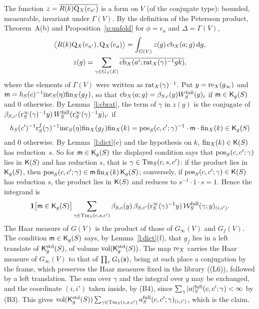 \documentclass[11pt,a4paper]{article}
\makeatletter
\theoremstyle{plainx}
\theoremstyle{uprightx}
\renewenvironment{proof}[1][Proof]{\par\pushQED{\qed}\normalfont\topsep0pt\partopsep0pt
  \trivlist\item[\hskip\labelsep\itshape #1.]\ignorespaces}{\popQED\endtrivlist\@endpefalse}
\newcommand{\dd}{\mathrm{d}}
\newcommand{\Inp}[1]{\textup{(#1)}}
\makeatother
\begin{document}
\begin{proof}[Proof of Theorem B]
The function $z=\overline{R(k)\mathrm{Q}_{X}(e_{a'})}$ is a form on $V$ (of the conjugate type): bounded, measurable,
invariant under $\Gamma(V)$. By the definition of the Petersson product, Theorem~A(b) and
Proposition~\ref{p:unfold} for $\phi=e_a$ and $\Delta=\Gamma(V)$,
\begin{gather*}\bigl\langle R(k)\Pmap{X}(e_{a'}),\Pmap{X}(e_a)\bigr\rangle=\int_{G(V)}z(g)\,\cutB{X}{a}{g}\,\dd g,\\
z(g)=\sum_{\gamma\in\GS{S}{E}}\overline{\cutB{X}{a'}{\ratEq{X}(\gamma)^{-1}gk}},\end{gather*}
where the elements of $\Gamma(V)$ were written as $\mathrm{rat}_{X}(\gamma)^{-1}$. Put $y=\mathrm{re}_{X}(g_\infty)$ and
$\mathsf{m}=h_{S}(c)^{-1}\mathrm{inc}_{S}(\eta)\mathrm{fin}_{X}(g_f)$, so that $\mathrm{cb}_{X}(a;g)=\beta_{S,c}(y)W^{\mathrm{full}}_{S}(y)_{i}$ if
$\mathsf{m}\in\mathsf{K}_g(S)$ and $0$ otherwise. By Lemma~\ref{l:cbrat}, the term of $\gamma$ in $z(g)$ is the conjugate of
$\beta_{S,c'}(\mathrm{r}^{\infty}_{S}(\gamma)^{-1}y)\,W^{\mathrm{full}}_{S}(\mathrm{r}^{\infty}_{S}(\gamma)^{-1}y)_{i'}$ if
\[h_{S}(c')^{-1}\mathrm{r}^{f}_{S}(\gamma)^{-1}\mathrm{inc}_{S}(\eta)\mathrm{fin}_{X}(g_f)\mathrm{fin}_{X}(k)=\mathrm{pos}_{S}(c,c';\gamma)^{-1}\cdot\mathsf{m}\cdot\mathrm{fin}_{X}(k)\in\mathsf{K}_g(S)\]
and $0$ otherwise. By Lemma~\ref{l:dict}(e) and the hypothesis on $k$, $\mathrm{fin}_{X}(k)\in\mathsf{K}(S)$ has reduction~$s$. So
for $\mathsf{m}\in\mathsf{K}_g(S)$ the displayed condition says that $\mathrm{pos}_{S}(c,c';\gamma)$ lies in $\mathsf{K}(S)$ and has
reduction $s$, that is $\gamma\in\mathrm{Tm}_{S}(c,s,c')$: if the product lies in $\mathsf{K}_g(S)$, then
$\mathrm{pos}_{S}(c,c';\gamma)\in\mathsf{m}\,\mathrm{fin}_{X}(k)\,\mathsf{K}_g(S)$; conversely, if $\mathrm{pos}_{S}(c,c';\gamma)\in\mathsf{K}(S)$ has
reduction $s$, the product lies in $\mathsf{K}(S)$ and reduces to $s^{-1}\cdot1\cdot s=1$. Hence the integrand is
\[\mathbf{1}\bigl[\mathsf{m}\in\mathsf{K}_g(S)\bigr]\sum_{\gamma\in\mathrm{Tm}_{S}(c,s,c')}\beta_{S,c}(y)\,\beta_{S,c'}(\mathrm{r}^{\infty}_{S}(\gamma)^{-1}y)\,
\mathcal{W}^{\mathrm{full}}_{S}(\gamma;y)_{(i,i')}.\]
The Haar measure of $G(V)$ is the product of those of $G_\infty(V)$ and $G_f(V)$. The condition
$\mathsf{m}\in\mathsf{K}_g(S)$ says, by Lemma~\ref{l:dict}(f), that $g_f$ lies in a left translate of $\mathsf{K}^{\mathrm{std}}_{g}(S)$, of volume
$\operatorname{vol}(\mathsf{K}^{\mathrm{std}}_{g}(S))$. The map $\mathrm{re}_{X}$ carries the Haar measure of $G_\infty(V)$ to that of $\prod_\tau G_{1}(\mathfrak{s})$,
being at each place a conjugation by the frame, which preserves the Haar measures fixed in the library
(\Inp{L6}), followed by a left translation. The sum over $\gamma$ and the integral over $y$ may be exchanged, and the coordinate $(i,i')$
taken inside, by \Inp{B4}, since $\sum_\gamma|a|^{\mathrm{full}}_{S}(c,c';\gamma)<\infty$ by \Inp{B3}. This gives
$\operatorname{vol}(\mathsf{K}^{\mathrm{std}}_{g}(S))\sum_{\gamma\in\mathrm{Tm}_{S}(c,s,c')}a^{\mathrm{full}}_{S}(c,c';\gamma)_{(i,i')}$, which is the claim.
\end{proof}
\end{document}
